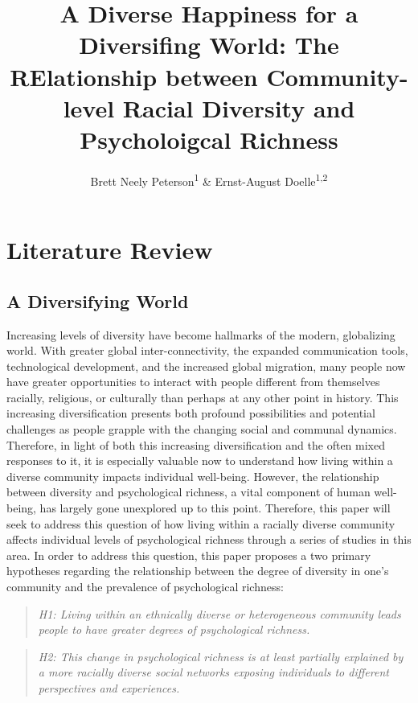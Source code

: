 \documentclass[
  man]{apa6}
\title{A Diverse Happiness for a Diversifing World: The RElationship between Community-level Racial Diversity and Psycholoigcal Richness}
\author{Brett Neely Peterson\textsuperscript{1} \& Ernst-August Doelle\textsuperscript{1,2}}
\date{}
\affiliation{\vspace{0.5cm}\textsuperscript{1} The University of Chicagi\\\textsuperscript{2} Konstanz Business School}
\begin{document}
\maketitle

\hypertarget{literature-review}{%
\section{Literature Review}\label{literature-review}}

\hypertarget{a-diversifying-world}{%
\subsection{A Diversifying World}\label{a-diversifying-world}}

Increasing levels of diversity have become hallmarks of the modern, globalizing world. With greater global inter-connectivity, the expanded communication tools, technological development, and the increased global migration, many people now have greater opportunities to interact with people different from themselves racially, religious, or culturally than perhaps at any other point in history. This increasing diversification presents both profound possibilities and potential challenges as people grapple with the changing social and communal dynamics. Therefore, in light of both this increasing diversification and the often mixed responses to it, it is especially valuable now to understand how living within a diverse community impacts individual well-being. However, the relationship between diversity and psychological richness, a vital component of human well-being, has largely gone unexplored up to this point. Therefore, this paper will seek to address this question of how living within a racially diverse community affects individual levels of psychological richness through a series of studies in this area. In order to address this question, this paper proposes a two primary hypotheses regarding the relationship between the degree of diversity in one's community and the prevalence of psychological richness:

\begin{quote}
\emph{H1: Living within an ethnically diverse or heterogeneous community leads people to have greater degrees of psychological richness.}
\end{quote}

\begin{quote}
\emph{H2: This change in psychological richness is at least partially explained by a more racially diverse social networks exposing individuals to different perspectives and experiences.}
\end{quote}
\end{document}
